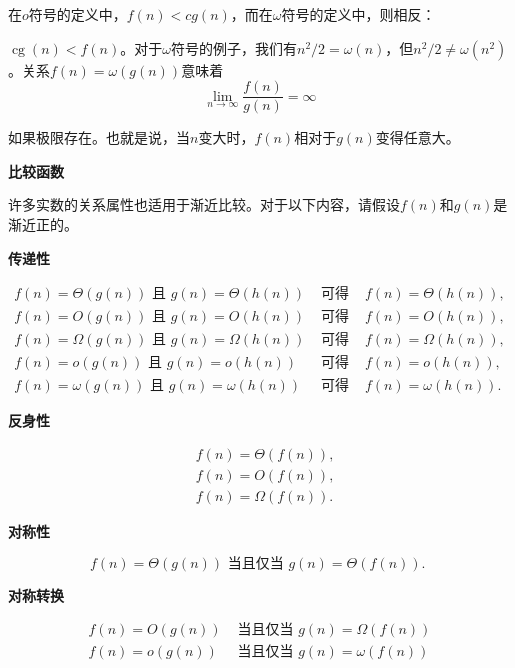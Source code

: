 \documentclass[lang=cn,newtx,10pt,scheme=chinese]{elegantbook}
\begin{document}
在$o$符号的定义中，$f(n)<c g(n)$，而在$\omega$符号的定义中，则相反：

$\operatorname{cg}(n)<f(n)$。对于$\omega$符号的例子，我们有$n^2 / 2=\omega(n)$，但$n^2 / 2 \neq \omega\left(n^2\right)$。关系$f(n)=\omega(g(n))$意味着
$$
\lim _{n \rightarrow \infty} \frac{f(n)}{g(n)}=\infty
$$

如果极限存在。也就是说，当$n$变大时，$f(n)$相对于$g(n)$变得任意大。

\textbf{比较函数}

许多实数的关系属性也适用于渐近比较。对于以下内容，请假设$f(n)$和$g(n)$是渐近正的。

\textbf{传递性}

\begin{equation*}
\begin{array}{llll}
f(n)=\Theta(g(n)) \text { 且 } g(n)=\Theta(h(n)) & \text { 可得 } & f(n)=\Theta(h(n)), \\
f(n)=O(g(n)) \text { 且 } g(n)=O(h(n)) & \text { 可得 } & f(n)=O(h(n)), \\
f(n)=\Omega(g(n)) \text { 且 } g(n)=\Omega(h(n)) & \text { 可得 } & f(n)=\Omega(h(n)), \\
f(n)=o(g(n)) \text { 且 } g(n)=o(h(n)) & \text { 可得 } & f(n)=o(h(n)), \\
f(n)=\omega(g(n)) \text { 且 } g(n)=\omega(h(n)) & \text { 可得 } & f(n)=\omega(h(n)) .
\end{array}
\end{equation*}

\textbf{反身性}

\begin{equation*}
\begin{aligned}
& f(n)=\Theta(f(n)), \\
& f(n)=O(f(n)), \\
& f(n)=\Omega(f(n)) .
\end{aligned}
\end{equation*}

\textbf{对称性}

$$
f(n)=\Theta(g(n)) \text { 当且仅当 } g(n)=\Theta(f(n)) \text {. }
$$

\textbf{对称转换}

\begin{equation*}
\begin{array}{ll}
f(n)=O(g(n)) & \text { 当且仅当 } g(n)=\Omega(f(n)) \\
f(n)=o(g(n)) & \text { 当且仅当 } g(n)=\omega(f(n))
\end{array}
\end{equation*}
\end{document}
